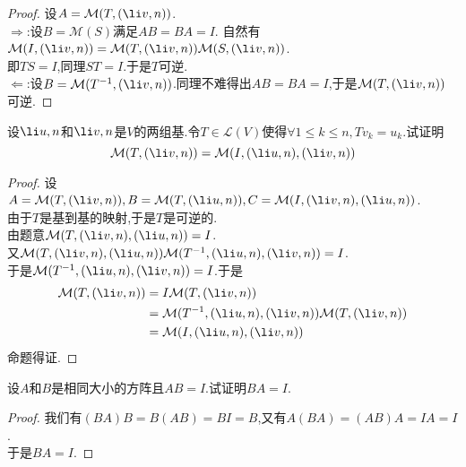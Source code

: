 \documentclass{ctexart}
\begin{document}
\begin{proof}
    设$A=\mathcal{M}(T,(\li v,n))$.\\
    $\Rightarrow$:设$B=\mathcal{M}(S)$满足$AB=BA=I$.
    自然有$\mathcal{M}(I,(\li v,n))=\mathcal{M}(T,(\li v,n))\mathcal{M}(S,(\li v,n))$.\\
    即$TS=I$,同理$ST=I$.于是$T$可逆.\\
    $\Leftarrow$:设$B=\mathcal{M}(T^{-1},(\li v,n))$.同理不难得出$AB=BA=I$,于是$\mathcal{M}(T,(\li v,n))$可逆.
\end{proof}
\begin{problem}[23.]
    设$\li u,n$和$\li v,n$是$V$的两组基.令$T\in\mathcal{L}(V)$使得$\forall 1\leqslant k\leqslant n,Tv_k=u_k$.试证明
    $$\mathcal{M}(T,(\li v,n))=\mathcal{M}(I,(\li u,n),(\li v,n))$$
\end{problem}
\begin{proof}
    设$A=\mathcal{M}(T,(\li v,n)),B=\mathcal{M}(T,(\li u,n)),C=\mathcal{M}(I,(\li v,n),(\li u,n))$.\\
    由于$T$是基到基的映射,于是$T$是可逆的.\\
    由题意$\mathcal{M}(T,(\li v,n),(\li u,n))=I$.\\
    又$\mathcal{M}(T,(\li v,n),(\li u,n))\mathcal{M}(T^{-1},(\li u,n),(\li v,n))=I$.\\
    于是$\mathcal{M}(T^{-1},(\li u,n),(\li v,n))=I$.于是
    $$\begin{aligned}
        \mathcal{M}(T,(\li v,n))
        &= I\mathcal{M}(T,(\li v,n))\\
        &= \mathcal{M}(T^{-1},(\li u,n),(\li v,n))\mathcal{M}(T,(\li v,n))\\
        &= \mathcal{M}(I,(\li u,n),(\li v,n))
    \end{aligned}$$
    命题得证.
\end{proof}
\begin{problem}[24.]
    设$A$和$B$是相同大小的方阵且$AB=I$.试证明$BA=I$.
\end{problem}
\begin{proof}
    我们有$(BA)B=B(AB)=BI=B$,又有$A(BA)=(AB)A=IA=I$.\\
    于是$BA=I$.
\end{proof}
\end{document}
